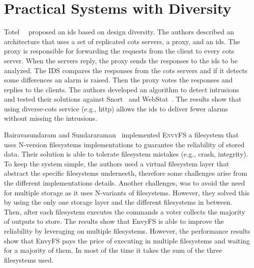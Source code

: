 \section{Practical Systems with Diversity}

Totel~\etal{}~\cite{Totel:2005} proposed an \gls{ids} based on design diversity.
The authors described an architecture that uses a set of replicated \gls{cots} servers, a proxy, and an \gls{ids}. 
The proxy is responsible for forwarding the requests from the client to every \gls{cots} server. 
When the servers reply, the proxy sends the responses to the \gls{ids} to be analyzed. 
The IDS compares the responses from the \gls{cots} servers and if it detects some differences an alarm is raised. 
Then the proxy votes the responses and replies to the clients. 
The authors developed an algorithm to detect intrusions and tested their solutions against Snort~\cite{snort} and WebStat~\cite{Vigna:2003}. 
The results show that using diverse-\gls{cots} service (e.g., http) allows the \gls{ids} to deliver fewer alarms without missing the intrusions.

Bairavasundaram and Sundararaman~\cite{Bairavasundaram:2009} implemented \textsc{EnvyFS} a filesystem that uses N-version filesystems implementations to guarantee the reliability of stored data.
Their solution is able to tolerate filesystem mistakes (e.g., crash, integrity).
To keep the system simple, the authors used a virtual filesystem layer that abstract the specific filesystems underneeth, therefore some challenges arise from the different implementations details.
Another challenges, was to avoid the need for multiple storage as it uses N-variants of filesystems. 
However, they solved this by using the only one storage layer and the different filesystems in between. 
Then, after each filesystem executes the commands a voter collects the majority of outputs to store.
The results show that EnvyFS is able to improve the reliability by leveraging on multiple filesystems.
However, the performance results show that EnvyFS pays the price of executing in multiple filesystems and waiting for a majority of them. 
In most of the time it takes the sum of the three filesystems used.

